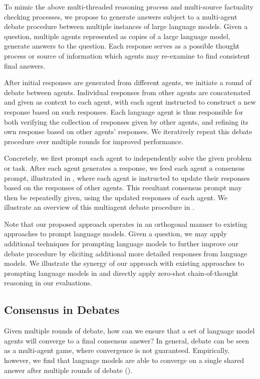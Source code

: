 To mimic the above multi-threaded 
 reasoning process and multi-source factuality checking processes, we propose to generate answers subject to a multi-agent debate procedure between multiple instances of large language models. Given a question, multiple agents represented as copies of a large language model, generate answers to the question. Each response serves as a possible thought process or source of information which agents may re-examine to find consistent final answers.

After initial responses are generated from different agents, we initiate a round of debate between agents. Individual responses from other agents are concatenated and given as context to each agent, with each agent instructed to construct a new response based on such responses. Each language agent is thus responsible for both verifying the collection of responses given by other agents, and refining its own response based on other agents' responses. We iteratively repeat this debate procedure over multiple rounds for improved performance. 

Concretely, we first prompt each agent to independently solve the given problem or task. After each agent generates a response, we feed each agent a consensus prompt, illustrated in , where each agent is instructed to update their responses based on the responses of other agents. This resultant consensus prompt may then be repeatedly given, using the updated responses of each agent.
We illustrate an overview of this multiagent debate procedure in .


Note that our proposed approach operates in an orthogonal manner to existing approaches to prompt language models. Given a question, we may apply additional techniques for prompting language models to further improve our debate procedure by eliciting additional more detailed responses from language models. We illustrate the synergy of our approach with existing approaches to prompting language models in  and directly apply zero-shot chain-of-thought reasoning in our evaluations.




\vspace{-5pt}
\subsection{Consensus in Debates}
\label{sect:consensus}

Given multiple rounds of debate, how can we ensure that a set of  language model agents will converge to a final consensus answer? In general, debate can be seen as a multi-agent game, where convergence is not guaranteed. Empirically, however, we find that language models are able to converge on a single shared answer after multiple rounds of debate ().


